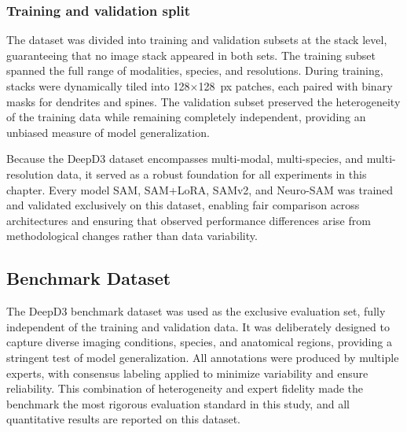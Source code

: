 \subsubsection{\textbf{Training and validation split}}
The dataset was divided into training and validation subsets at the stack level, guaranteeing that no image stack appeared in both sets. The training subset spanned the full range of modalities, species, and resolutions. During training, stacks were dynamically tiled into 128$\times$128~px patches, each paired with binary masks for dendrites and spines. The validation subset preserved the heterogeneity of the training data while remaining completely independent, providing an unbiased measure of model generalization.

Because the \gls{DeepD3} dataset encompasses multi-modal, multi-species, and multi-resolution data, it served as a robust foundation for all experiments in this chapter. Every model \gls{SAM}, \gls{SAM}+\gls{LoRA}, \gls{SAMv2}, and Neuro-\gls{SAM} was trained and validated exclusively on this dataset, enabling fair comparison across architectures and ensuring that observed performance differences arise from methodological changes rather than data variability.

\subsection{Benchmark Dataset}
The \gls{DeepD3} benchmark dataset \cite{Fernholz_2024} was used as the exclusive evaluation set, fully independent of the training and validation data. It was deliberately designed to capture diverse imaging conditions, species, and anatomical regions, providing a stringent test of model generalization. All annotations were produced by multiple experts, with consensus labeling applied to minimize variability and ensure reliability. This combination of heterogeneity and expert fidelity made the benchmark the most rigorous evaluation standard in this study, and all quantitative results are reported on this dataset.

